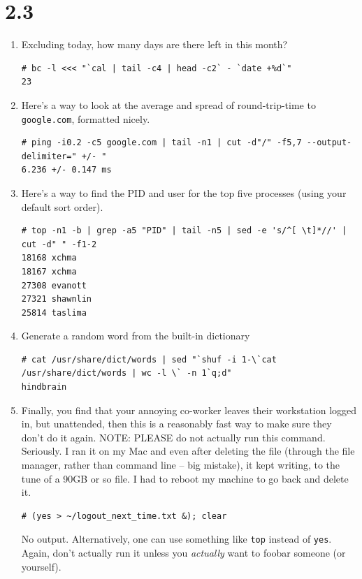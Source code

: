 \documentclass{article}
\begin{document}
\section{2.3}
\begin{enumerate}[1.]
\item Excluding today, how many days are there left in this month?
\begin{verbatim}
# bc -l <<< "`cal | tail -c4 | head -c2` - `date +%d`"
23
\end{verbatim}

\item Here's a way to look at the average and spread of round-trip-time to \texttt{google.com}, formatted
nicely.
\begin{verbatim}
# ping -i0.2 -c5 google.com | tail -n1 | cut -d"/" -f5,7 --output-delimiter=" +/- "
6.236 +/- 0.147 ms
\end{verbatim}

\item Here's a way to find the PID and user for the top five processes (using your default sort order).
\begin{verbatim}
# top -n1 -b | grep -a5 "PID" | tail -n5 | sed -e 's/^[ \t]*//' | cut -d" " -f1-2
18168 xchma
18167 xchma
27308 evanott
27321 shawnlin
25814 taslima
\end{verbatim}

\item Generate a random word from the built-in dictionary
\begin{verbatim}
# cat /usr/share/dict/words | sed "`shuf -i 1-\`cat /usr/share/dict/words | wc -l \` -n 1`q;d"
hindbrain
\end{verbatim}


\item Finally, you find that your annoying co-worker leaves their workstation logged in, but unattended, then this is a reasonably fast way to make sure they don't do it again. NOTE: PLEASE do not actually run this command. Seriously. I ran it on my Mac and even after deleting the file (through the file manager, rather than command line -- big mistake), it kept writing, to the tune of a 90GB or so file. I had to reboot my machine to go back and delete it.
\begin{verbatim}
# (yes > ~/logout_next_time.txt &); clear
\end{verbatim}
No output. Alternatively, one can use something like \texttt{top} instead of \texttt{yes}. Again, don't actually
run it unless you \emph{actually} want to foobar someone (or yourself).
\end{enumerate}
%
%
\end{document}
